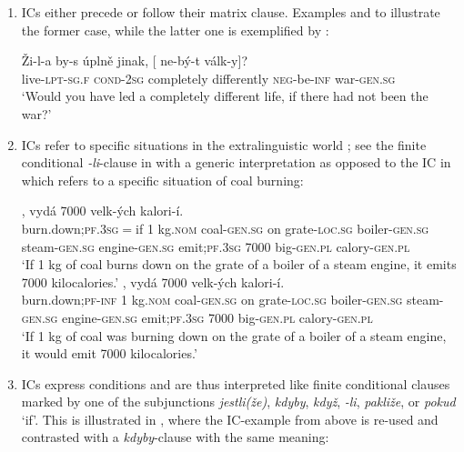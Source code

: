 \documentclass[output=paper,colorlinks,citecolor=brown,
modfonts,newtxmath
]{langscibook}
\begin{document}
\begin{enumerate}
\item ICs either precede or follow their matrix clause. Examples  and  to  illustrate the former case, while the latter one is exemplified by :

\ea\label{ex:war}
\gll Ži-l-a by-s úplně jinak, [\hspace{-2pt} ne-bý-t válk-y]?\\
     live-\textsc{lpt-sg.f} \textsc{cond-2sg} completely differently {} \textsc{neg}-be-\textsc{inf} war-\textsc{gen.sg}\\ 
\glt `Would you have led a completely different life, if there had not been the war?' \hfill \citep[Czech;][7]{Milotova2012}
\z

\item ICs refer to specific situations in the extralinguistic world \citep[77]{Svoboda1960a}; see the finite conditional \textit{-li}-clause in  with a generic interpretation as opposed to the IC in  which refers to a specific situation of coal burning:

\ea\label{ex:kettle}
\ea\label{ex:kettle-a}
, vydá 7000 velk-ých kalori-í.\\ 
     {} {burn.down};\textsc{pf}.\textsc{3sg}$=$if 1 kg.\textsc{nom} coal-\textsc{gen.sg} on grate-\textsc{loc.sg} boiler-\textsc{gen.sg} steam-\textsc{gen.sg} engine-\textsc{gen.sg} emit;\textsc{pf}.\textsc{3sg} 7000 big-\textsc{gen.pl} calory-\textsc{gen.pl}\\
\glt `If 1 kg of coal burns down on the grate of a boiler of a steam engine, it emits 7000 kilocalories.'
\ex\label{ex:kettle-b}
, vydá 7000 velk-ých kalori-í.\\
     {} {burn.down};\textsc{pf}-\textsc{inf} 1 kg.\textsc{nom} coal-\textsc{gen.sg} on grate-\textsc{loc.sg} boiler-\textsc{gen.sg} steam-\textsc{gen.sg} engine-\textsc{gen.sg} emit;\textsc{pf}.\textsc{3sg} 7000 big-\textsc{gen.pl} calory-\textsc{gen.pl}\\
\glt `If 1 kg of coal was burning down on the grate of a boiler of a steam engine, it would emit 7000 kilocalories.' \\ \hfill \citep[Czech;][77]{Svoboda1960a}
\z
\z

\item ICs express conditions and are thus interpreted like finite conditional clauses marked by one of the subjunctions \textit{jestli(že)}, \textit{kdyby}, \textit{když}, \textit{-li}, \textit{pakliže}, or \textit{pokud} `if'. This is illustrated in , where the IC-example  from above is re-used and contrasted with a \textit{kdyby}-clause with the same meaning:


\end{enumerate}
\end{document}
